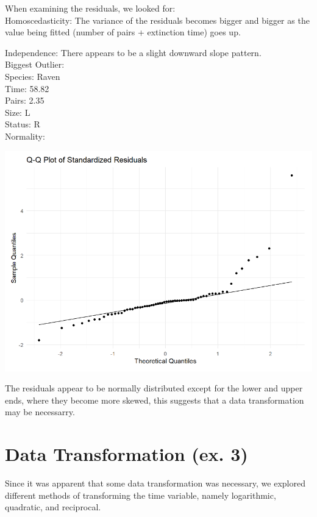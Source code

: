 \documentclass{article}
\begin{document}
When examining the residuals, we looked for: \\

Homoscedasticity: The variance of the residuals becomes bigger and bigger as the value
being fitted (number of pairs + extinction time) goes up.

Independence: There appears to be a slight downward slope pattern. \\

Biggest Outlier: \\
Species: Raven \\
Time: 58.82 \\
Pairs: 2.35 \\
Size: L \\
Status: R \\

Normality:

\begin{center}
\includegraphics[scale=0.5]{graphs/qq-residuals.png}
\end{center}

The residuals appear to be normally distributed except for the lower and upper ends, where they become more skewed, this suggests that a data transformation may be necessarry.


\section{Data Transformation (ex. 3)}

Since it was apparent that some data transformation was necessary, we explored different methods of transforming the time variable, namely logarithmic, quadratic, and reciprocal.
\end{document}
